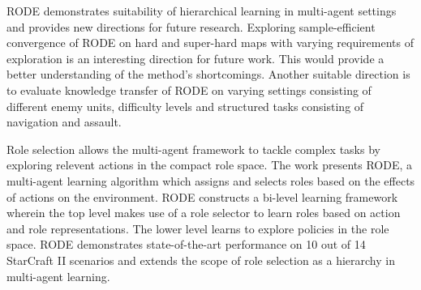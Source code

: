 \documentclass[11pt,letterpaper]{article}
\begin{document}
RODE demonstrates suitability of hierarchical learning in multi-agent settings and provides new directions for future research. Exploring sample-efficient convergence of RODE on hard and super-hard maps with varying requirements of exploration is an interesting direction for future work. This would provide a better understanding of the method's shortcomings. Another suitable direction is to evaluate knowledge transfer of RODE on varying settings consisting of different enemy units, difficulty levels and structured tasks consisting of navigation and assault. 

Role selection allows the multi-agent framework to tackle complex tasks by exploring relevent actions in the compact role space. The work presents RODE, a multi-agent learning algorithm which assigns and selects roles based on the effects of actions on the environment. RODE constructs a bi-level learning framework wherein the top level makes use of a role selector to learn roles based on action and role representations. The lower level learns to explore policies in the role space. RODE demonstrates state-of-the-art performance on 10 out of 14 StarCraft II scenarios and extends the scope of role selection as a hierarchy in multi-agent learning. 
\end{document}
